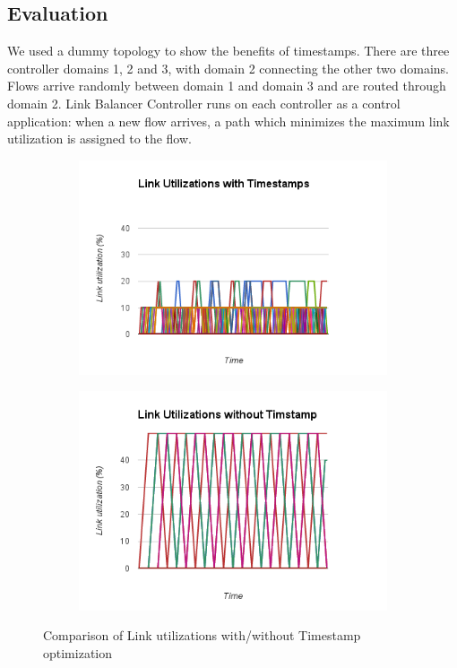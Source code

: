 \documentclass[10pt, twocolumn]{article}
\begin{document}
\subsection{Evaluation}
We used a dummy topology to show the benefits of timestamps. There are three controller domains 1, 2 and 3, with domain 2 connecting the other two domains. Flows arrive randomly between domain 1 and domain 3 and are routed through domain 2. Link Balancer Controller \cite{logically-centralized} runs on each controller as a control application: when a new flow arrives, a path which minimizes the maximum link utilization is assigned to the flow.

\begin{figure}

\begin{subfigure}{.5\textwidth}
 \includegraphics[scale=0.4]{chart_1}
\end{subfigure}
\begin{subfigure}{.5\textwidth}
 \includegraphics[scale=0.4]{chart_2}
\end{subfigure}
\caption{Comparison of Link utilizations with/without Timestamp optimization}
\label{fig:timestamp}
\end{figure}
\end{document}
